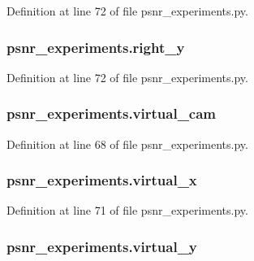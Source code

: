 Definition at line 72 of file psnr\+\_\+experiments.\+py.

\subsubsection[{\texorpdfstring{right\+\_\+y}{right_y}}]{\setlength{\rightskip}{0pt plus 5cm}psnr\+\_\+experiments.\+right\+\_\+y}\hypertarget{namespacepsnr__experiments_a75d9f6e7c130f394ccdd236191603e5c}{}\label{namespacepsnr__experiments_a75d9f6e7c130f394ccdd236191603e5c}


Definition at line 72 of file psnr\+\_\+experiments.\+py.

\subsubsection[{\texorpdfstring{virtual\+\_\+cam}{virtual_cam}}]{\setlength{\rightskip}{0pt plus 5cm}psnr\+\_\+experiments.\+virtual\+\_\+cam}\hypertarget{namespacepsnr__experiments_ac86607a93b7487822749da9fa9a881c3}{}\label{namespacepsnr__experiments_ac86607a93b7487822749da9fa9a881c3}


Definition at line 68 of file psnr\+\_\+experiments.\+py.

\subsubsection[{\texorpdfstring{virtual\+\_\+x}{virtual_x}}]{\setlength{\rightskip}{0pt plus 5cm}psnr\+\_\+experiments.\+virtual\+\_\+x}\hypertarget{namespacepsnr__experiments_a7f575b8c058710f86762fea9a6a51fa0}{}\label{namespacepsnr__experiments_a7f575b8c058710f86762fea9a6a51fa0}


Definition at line 71 of file psnr\+\_\+experiments.\+py.

\subsubsection[{\texorpdfstring{virtual\+\_\+y}{virtual_y}}]{\setlength{\rightskip}{0pt plus 5cm}psnr\+\_\+experiments.\+virtual\+\_\+y}\hypertarget{namespacepsnr__experiments_aa8d539be966b440eb296d7ac86bebd0c}{}\label{namespacepsnr__experiments_aa8d539be966b440eb296d7ac86bebd0c}


